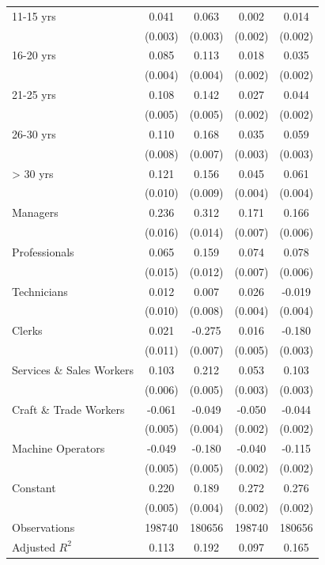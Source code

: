 \begin{center}
\begin{table}[htbp]
{\begin{tabular}{lcccc}
11-15 yrs & 0.041\sym{{*}{*}{*}} & 0.063\sym{{*}{*}{*}} & 0.002 & 0.014\sym{{*}{*}{*}}\tabularnewline
 & (0.003) & (0.003) & (0.002) & (0.002)\tabularnewline
16-20 yrs & 0.085\sym{{*}{*}{*}} & 0.113\sym{{*}{*}{*}} & 0.018\sym{{*}{*}{*}} & 0.035\sym{{*}{*}{*}}\tabularnewline
 & (0.004) & (0.004) & (0.002) & (0.002)\tabularnewline
21-25 yrs & 0.108\sym{{*}{*}{*}} & 0.142\sym{{*}{*}{*}} & 0.027\sym{{*}{*}{*}} & 0.044\sym{{*}{*}{*}}\tabularnewline
 & (0.005) & (0.005) & (0.002) & (0.002)\tabularnewline
26-30 yrs & 0.110\sym{{*}{*}{*}} & 0.168\sym{{*}{*}{*}} & 0.035\sym{{*}{*}{*}} & 0.059\sym{{*}{*}{*}}\tabularnewline
 & (0.008) & (0.007) & (0.003) & (0.003)\tabularnewline
> 30 yrs & 0.121\sym{{*}{*}{*}} & 0.156\sym{{*}{*}{*}} & 0.045\sym{{*}{*}{*}} & 0.061\sym{{*}{*}{*}}\tabularnewline
 & (0.010) & (0.009) & (0.004) & (0.004)\tabularnewline
Managers & 0.236\sym{{*}{*}{*}} & 0.312\sym{{*}{*}{*}} & 0.171\sym{{*}{*}{*}} & 0.166\sym{{*}{*}{*}}\tabularnewline
 & (0.016) & (0.014) & (0.007) & (0.006)\tabularnewline
Professionals & 0.065\sym{{*}{*}{*}} & 0.159\sym{{*}{*}{*}} & 0.074\sym{{*}{*}{*}} & 0.078\sym{{*}{*}{*}}\tabularnewline
 & (0.015) & (0.012) & (0.007) & (0.006)\tabularnewline
Technicians & 0.012 & 0.007 & 0.026\sym{{*}{*}{*}} & -0.019\sym{{*}{*}{*}}\tabularnewline
 & (0.010) & (0.008) & (0.004) & (0.004)\tabularnewline
Clerks & 0.021 & -0.275\sym{{*}{*}{*}} & 0.016\sym{{*}{*}{*}} & -0.180\sym{{*}{*}{*}}\tabularnewline
 & (0.011) & (0.007) & (0.005) & (0.003)\tabularnewline
Services \& Sales Workers & 0.103\sym{{*}{*}{*}} & 0.212\sym{{*}{*}{*}} & 0.053\sym{{*}{*}{*}} & 0.103\sym{{*}{*}{*}}\tabularnewline
 & (0.006) & (0.005) & (0.003) & (0.003)\tabularnewline
Craft \& Trade Workers & -0.061\sym{{*}{*}{*}} & -0.049\sym{{*}{*}{*}} & -0.050\sym{{*}{*}{*}} & -0.044\sym{{*}{*}{*}}\tabularnewline
 & (0.005) & (0.004) & (0.002) & (0.002)\tabularnewline
Machine Operators & -0.049\sym{{*}{*}{*}} & -0.180\sym{{*}{*}{*}} & -0.040\sym{{*}{*}{*}} & -0.115\sym{{*}{*}{*}}\tabularnewline
 & (0.005) & (0.005) & (0.002) & (0.002)\tabularnewline
Constant & 0.220\sym{{*}{*}{*}} & 0.189\sym{{*}{*}{*}} & 0.272\sym{{*}{*}{*}} & 0.276\sym{{*}{*}{*}}\tabularnewline
 & (0.005) & (0.004) & (0.002) & (0.002)\tabularnewline
Observations & 198740 & 180656 & 198740 & 180656\tabularnewline
Adjusted $R^{2}$ & 0.113 & 0.192 & 0.097 & 0.165\tabularnewline
\bottomrule
\end{tabular}}
\end{table}
\begin{table}
\caption{Regression models for the college-high school log wage gap, 2004-2020}


\end{table}
\end{center}
